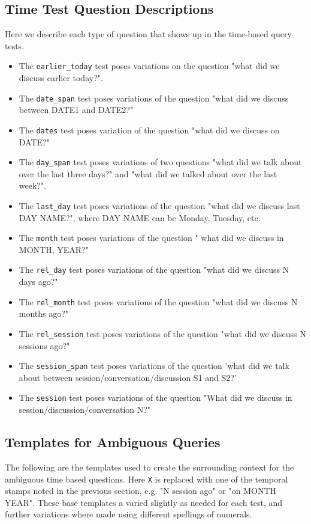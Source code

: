 \documentclass{article}
\begin{document}
\subsection{Time Test Question Descriptions}\label{app:timetest}
Here we describe each type of question that shows up in the time-based query tests.
\begin{itemize}
    \item The \texttt{earlier\_today} test poses variations on the question "what did we discuss earlier today?".
    \item The \texttt{date\_span} test poses variations of the question "what did we discuss between DATE1 and DATE2?"
    \item The \texttt{dates} test poses variation of the question "what did we discuss on DATE?"
    \item The \texttt{day\_span} test poses variations of two questions "what did we talk about over the last three days?" and "what did we talked about over the last week?".
    \item The \texttt{last\_day} test poses variations of the question "what did we discuss last DAY NAME?", where DAY NAME can be Monday, Tuesday, etc.
    \item The \texttt{month} test poses variations of the question " what did we discuss in MONTH, YEAR?"
    \item The \texttt{rel\_day} test poses variations of the question "what did we discuss N days ago?"
    \item The \texttt{rel\_month} test poses variations of the question "what did we discuss N months ago?"
    \item The \texttt{rel\_session} test poses variations of the question "what did we discuss N sessions ago?"
    \item The \texttt{session\_span} test poses variations of the question 'what did we talk about between session/conversation/discussion S1 and S2?'
    \item The \texttt{session} test poses variations of the question "What did we discuss in session/discussion/conversation N?"
\end{itemize}

\subsection{Templates for Ambiguous Queries}
The following are the templates used to create the surrounding context for the ambiguous time based questions. Here \texttt{X} is replaced with one of the temporal stamps noted in the previous section, e.g. "N session ago" or "on MONTH YEAR". These base templates a varied slightly as needed for each test, and further variations where made using different spellings of numerals.
\end{document}
